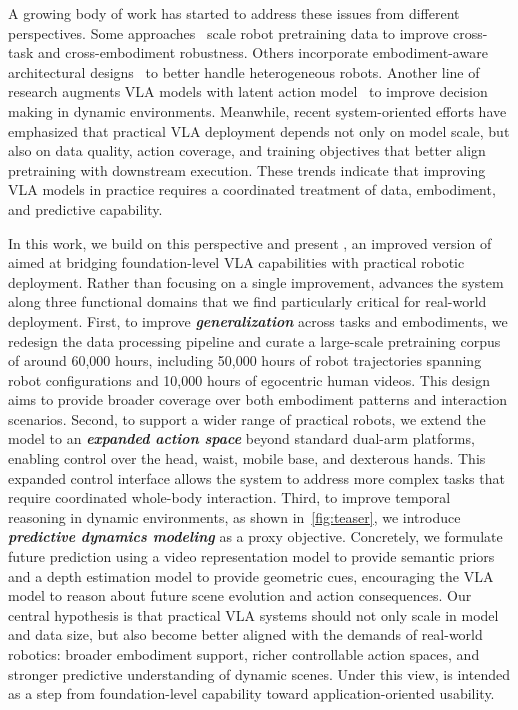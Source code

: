 A growing body of work has started to address these issues from different perspectives. Some approaches~\cite{beingH05,generalist2026gen1,lingbotvla} scale robot pretraining data to improve cross-task and cross-embodiment robustness.
Others incorporate embodiment-aware architectural designs~\cite{g0_5} to better handle heterogeneous robots. 
Another line of research augments VLA models with latent action model~\cite{dexWorldModel,lda1b} to improve decision making in dynamic environments. Meanwhile, recent system-oriented efforts have emphasized that practical VLA deployment depends not only on model scale, but also on data quality, action coverage, and training objectives that better align pretraining with downstream execution. These trends indicate that improving VLA models in practice requires a coordinated treatment of data, embodiment, and predictive capability.

In this work, we build on this perspective and present \method, an improved version of \methodold aimed at bridging foundation-level VLA capabilities with practical robotic deployment. Rather than focusing on a single improvement, \method advances the system along three functional domains that we find particularly critical for real-world deployment. First, to improve \textbf{\textit{generalization}} across tasks and embodiments, we redesign the data processing pipeline and curate a large-scale pretraining corpus of around 60,000 hours, including 50,000 hours of robot trajectories spanning \robotnum robot configurations and 10,000 hours of egocentric human videos. This design aims to provide broader coverage over both embodiment patterns and interaction scenarios. Second, to support a wider range of practical robots, we extend the model to an \textbf{\textit{expanded action space}} beyond standard dual-arm platforms, enabling control over the head, waist, mobile base, and dexterous hands. This expanded control interface allows the system to address more complex tasks that require coordinated whole-body interaction. Third, to improve temporal reasoning in dynamic environments, as shown in~\cref{fig:teaser}, we introduce \textbf{\textit{predictive dynamics modeling}} as a proxy objective. Concretely, we formulate future prediction using a video representation model to provide semantic priors and a depth estimation model to provide geometric cues, encouraging the VLA model to reason about future scene evolution and action consequences. Our central hypothesis is that practical VLA systems should not only scale in model and data size, but also become better aligned with the demands of real-world robotics: broader embodiment support, richer controllable action spaces, and stronger predictive understanding of dynamic scenes. Under this view, \method is intended as a step from foundation-level capability toward application-oriented usability.

